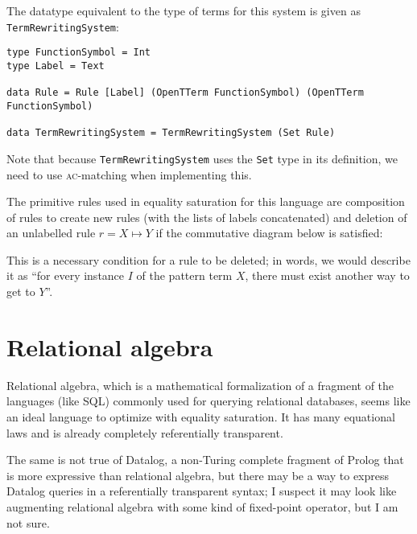 \documentclass[11pt]{report}
\newcommand{\haskell}[1]{\texttt{#1}}
\begin{document}
The datatype equivalent to the type of terms for this system is given as
\haskell{TermRewritingSystem}:

\vspace{-0.5em}
\begin{verbatim}
type FunctionSymbol = Int
type Label = Text

data Rule = Rule [Label] (OpenTTerm FunctionSymbol) (OpenTTerm FunctionSymbol)

data TermRewritingSystem = TermRewritingSystem (Set Rule)
\end{verbatim}

Note that because \haskell{TermRewritingSystem} uses the \haskell{Set} type in
its definition, we need to use \textsc{ac}-matching when implementing this.

The primitive rules used in equality saturation for this language are
composition of rules to create new rules (with the lists of labels concatenated)
and deletion of an unlabelled rule $r = X \mapsto Y$ if the commutative diagram
below is satisfied:

\begin{figure}[h!]
\centering
{}
\label{fig:deletion-cd}
\end{figure}

This is a necessary condition for a rule to be deleted; in words, we would
describe it as ``for every instance $I$ of the pattern term $X$, there must
exist another way to get to $Y$''.

\section{Relational algebra}
\label{sec:relational-algebra}

Relational algebra, which is a mathematical formalization of a fragment of the
languages (like SQL) commonly used for querying relational databases, seems like
an ideal language to optimize with equality saturation. It has many equational
laws and is already completely referentially transparent.

The same is not true of Datalog, a non-Turing complete fragment of Prolog that
is more expressive than relational algebra, but there may be a way to express
Datalog queries in a referentially transparent syntax; I suspect it may look
like augmenting relational algebra with some kind of fixed-point operator, but
I am not sure.
\end{document}

